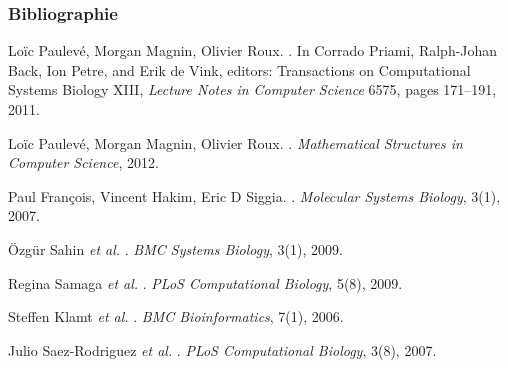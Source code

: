 \begin{frame}[c]
  \frametitle{Bibliographie}

\small
\setlength{\parindent}{-1em}
\setlength{\parskip}{0.5em}

\tcitebullet Loïc Paulevé, Morgan Magnin, Olivier Roux.
.
In Corrado Priami, Ralph-Johan Back, Ion Petre, and Erik de Vink, editors: Transactions on Computational Systems Biology XIII,
\textit{Lecture Notes in Computer Science} 6575, pages 171--191, 2011.

\tcitebullet Loïc Paulevé, Morgan Magnin, Olivier Roux.
.
\textit{Mathematical Structures in Computer Science}, 2012.

\tcitebullet Paul François, Vincent Hakim, Eric D Siggia.
.
\textit{Molecular Systems Biology}, 3(1), 2007.

\tcitebullet Özgür Sahin \textit{et al.}
.
\textit{BMC Systems Biology}, 3(1), 2009.

\tcitebullet Regina Samaga \textit{et al.}
.
\textit{PLoS Computational Biology}, 5(8), 2009.

\tcitebullet Steffen Klamt \textit{et al.}
.
\textit{BMC Bioinformatics}, 7(1), 2006.

\tcitebullet Julio Saez-Rodriguez \textit{et al.}
.
\textit{PLoS Computational Biology}, 3(8), 2007.

\end{frame}



